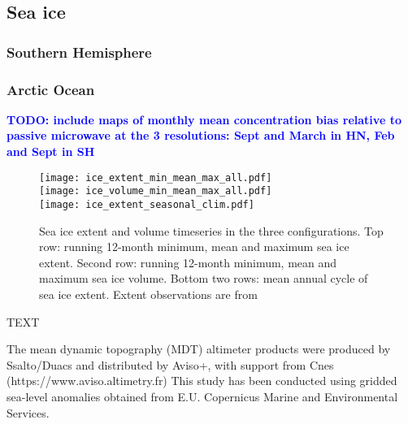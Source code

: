 \documentclass[gmd, manuscript]{copernicus}
\newcommand{\TODO}[1]{\textcolor{blue}{\textsf{\textbf{TODO: #1}}}}
\begin{document}
\subsection{Sea ice}

\subsubsection{Southern Hemisphere}


\subsubsection{Arctic Ocean}

\TODO{include maps of monthly mean concentration bias relative to passive microwave at the 3 resolutions: Sept and March in HN, Feb and Sept in SH}

\begin{figure}[ht]
\texttt{[image: ice\_extent\_min\_mean\_max\_all.pdf]}\\
\texttt{[image: ice\_volume\_min\_mean\_max\_all.pdf]}\\
\texttt{[image: ice\_extent\_seasonal\_clim.pdf]}\\
\caption[Sea ice extent and volume timeseries.]{Sea ice extent and volume timeseries in the three configurations. 
Top row: running 12-month minimum, mean and maximum sea ice extent.
Second row: running 12-month minimum, mean and maximum sea ice volume.
Bottom two rows: mean annual cycle of sea ice extent.
Extent observations are from \citet{FettererKnowlesMeierSavoieWindnagel2017a}}
\label{fig:icetimeseries}
\end{figure}


\conclusions  %
TEXT




The mean dynamic topography (MDT) altimeter products were produced by Ssalto/Duacs and distributed by Aviso+, with support from Cnes (https://www.aviso.altimetry.fr)
This study has been conducted using gridded sea-level anomalies obtained from E.U. Copernicus Marine and Environmental Services.
\end{document}
